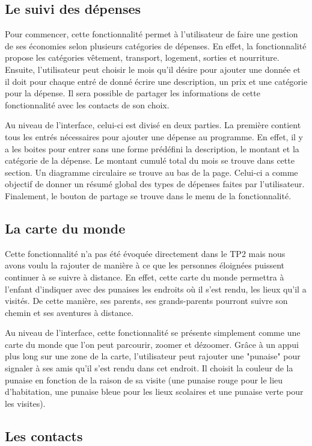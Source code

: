 \documentclass[11pt]{article}
\begin{document}
\subsection{Le suivi des dépenses}\label{par:depenses}
Pour commencer, cette fonctionnalité permet à l’utilisateur de faire une gestion de ses économies selon plusieurs catégories de dépenses. En effet, la fonctionnalité propose les catégories vêtement, transport, logement, sorties et nourriture. Ensuite, l’utilisateur peut choisir le mois qu’il désire pour  ajouter une donnée et il doit pour chaque entré de donné écrire une description, un prix et une catégorie pour la dépense. Il sera possible de partager les informations de cette fonctionnalité avec les contacts de son choix.

Au niveau de l’interface, celui-ci est divisé en deux parties. La première contient tous les entrés nécessaires pour ajouter une dépense au programme. En effet, il y a les boites pour entrer sans une forme prédéfini la description, le montant et la catégorie de la dépense. Le montant cumulé total du mois se trouve dans cette section. Un diagramme circulaire se trouve au bas de la page. Celui-ci a comme objectif de donner un résumé global des types de dépenses faites par l’utilisateur. Finalement, le bouton de partage se trouve dans le  menu de la fonctionnalité.
\subsection{La carte du monde}\label{par:carte}
Cette fonctionnalité n'a pas été évoquée directement dans le TP2 mais nous avons voulu la rajouter de manière à ce que les personnes éloignées puissent continuer à se suivre à distance. En effet, cette carte du monde permettra à l'enfant d'indiquer avec des punaises les endroits où il s'est rendu, les lieux qu'il a visités. De cette manière, ses parents, ses grands-parents pourront suivre son chemin et ses aventures à distance. 

Au niveau de l'interface, cette fonctionnalité se présente simplement comme une carte du monde que l'on peut parcourir, zoomer et dézoomer. Grâce à un appui plus long sur une zone de la carte, l'utilisateur peut rajouter une "punaise" pour signaler à ses amis qu'il s'est rendu dans cet endroit. Il choisit la couleur de la punaise en fonction de la raison de sa visite (une punaise rouge pour le lieu d'habitation, une punaise bleue pour les lieux scolaires et une punaise verte pour les visites).
\subsection{Les contacts}\label{par:contact}
\end{document}

